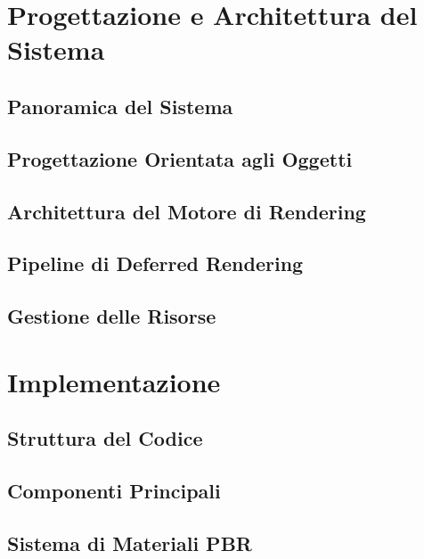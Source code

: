 \documentclass[12pt,a4paper,openright,twoside]{book}
\begin{document}
\chapter{Progettazione e Architettura del Sistema}
\label{chap:design}

\section{Panoramica del Sistema}

\section{Progettazione Orientata agli Oggetti}

\section{Architettura del Motore di Rendering}

\section{Pipeline di Deferred Rendering}

\section{Gestione delle Risorse}

\chapter{Implementazione}
\label{chap:implementation}

\section{Struttura del Codice}

\section{Componenti Principali}

\section{Sistema di Materiali PBR}
\end{document}

